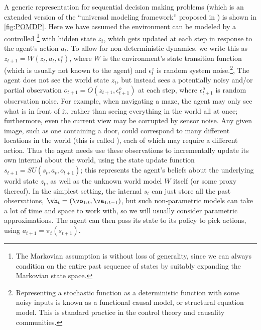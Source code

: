 A generic representation for sequential decision making problems
(which is an extended version of the ``universal modeling framework'' proposed in
\citep{Powell2022}) is shown in \cref{fig:POMDP}.
Here we have assumed the environment can be modeled by a  controlled
\footnote{
%
The Markovian assumption is without loss of generality,
since we can always condition on the entire past sequence of states
by suitably expanding the Markovian state space.
} %
with hidden state $z_t$, which gets updated at each step in response
to the agent's action $a_t$.
To allow for non-deterministic dynamics, we write this as 
 $z_{t+1}=W(z_t,a_t,\epsilon^z_t)$,
where
$W$ is the environment's state transition function (which is usually not
known to the agent)
and
$\epsilon^z_t$ is random system noise.\footnote{
%
Representing a stochastic function as a deterministic function with some noisy
inputs is known as a functional causal model,
or structural equation model.
This is standard practice in the control theory and causality communities.
},
The agent does not see the world state $z_t$, but instead
sees a potentially noisy and/or partial observation $o_{t+1}=O(z_{t+1},\epsilon^o_{t+1})$ at each step,
where $\epsilon^o_{t+1}$ is random observation noise.
For example, when navigating a maze, the agent may only see what is in front of it,
rather than seeing everything in the world all at once;
furthermore, even the current view may be corrupted by sensor noise.
Any given image, such as one containing a door, could correspond to many
different locations in the world (this is called ),
each of which may require a different action.
Thus the agent needs use  these observations to incrementally
update its own internal 
about the world,
using the state update function $s_{t+1}=SU(s_t,a_t,o_{t+1})$;
this represents the agent's beliefs about the underlying world state $z_t$,
as well as the unknown world model $W$ itself (or some proxy thereof).
In the simplest setting, the internal $s_t$ can just store all the past observations,
$\vh_t=(\vo_{1:t},\va_{1:t-1})$, but such non-parametric models
can take a lot of time and space to work with, so we will usually
consider parametric approximations.
The agent can then pass its state to its policy to pick actions,
using
$a_{t+1}=\pi_t(s_{t+1})$.


